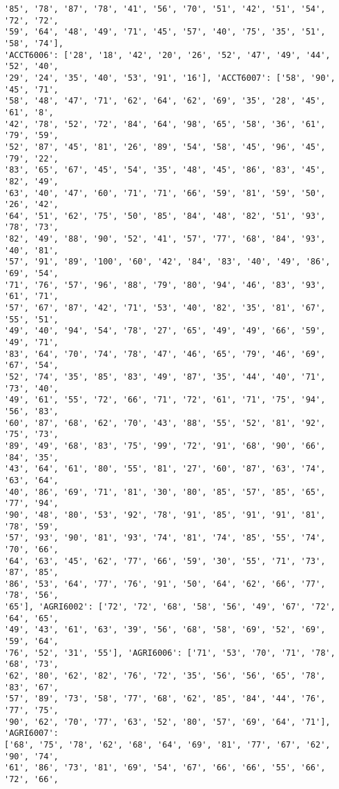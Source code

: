 \documentclass[11pt]{article}
\begin{document}
\begin{Verbatim}[commandchars=\\\{\}]
'85', '78', '87', '78', '41', '56', '70', '51', '42', '51', '54', '72', '72',
'59', '64', '48', '49', '71', '45', '57', '40', '75', '35', '51', '58', '74'],
'ACCT6006': ['28', '18', '42', '20', '26', '52', '47', '49', '44', '52', '40',
'29', '24', '35', '40', '53', '91', '16'], 'ACCT6007': ['58', '90', '45', '71',
'58', '48', '47', '71', '62', '64', '62', '69', '35', '28', '45', '61', '8',
'42', '78', '52', '72', '84', '64', '98', '65', '58', '36', '61', '79', '59',
'52', '87', '45', '81', '26', '89', '54', '58', '45', '96', '45', '79', '22',
'83', '65', '67', '45', '54', '35', '48', '45', '86', '83', '45', '82', '49',
'63', '40', '47', '60', '71', '71', '66', '59', '81', '59', '50', '26', '42',
'64', '51', '62', '75', '50', '85', '84', '48', '82', '51', '93', '78', '73',
'82', '49', '88', '90', '52', '41', '57', '77', '68', '84', '93', '40', '81',
'57', '91', '89', '100', '60', '42', '84', '83', '40', '49', '86', '69', '54',
'71', '76', '57', '96', '88', '79', '80', '94', '46', '83', '93', '61', '71',
'57', '67', '87', '42', '71', '53', '40', '82', '35', '81', '67', '55', '51',
'49', '40', '94', '54', '78', '27', '65', '49', '49', '66', '59', '49', '71',
'83', '64', '70', '74', '78', '47', '46', '65', '79', '46', '69', '67', '54',
'52', '74', '35', '85', '83', '49', '87', '35', '44', '40', '71', '73', '40',
'49', '61', '55', '72', '66', '71', '72', '61', '71', '75', '94', '56', '83',
'60', '87', '68', '62', '70', '43', '88', '55', '52', '81', '92', '75', '73',
'89', '49', '68', '83', '75', '99', '72', '91', '68', '90', '66', '84', '35',
'43', '64', '61', '80', '55', '81', '27', '60', '87', '63', '74', '63', '64',
'40', '86', '69', '71', '81', '30', '80', '85', '57', '85', '65', '77', '94',
'90', '48', '80', '53', '92', '78', '91', '85', '91', '91', '81', '78', '59',
'57', '93', '90', '81', '93', '74', '81', '74', '85', '55', '74', '70', '66',
'64', '63', '45', '62', '77', '66', '59', '30', '55', '71', '73', '87', '85',
'86', '53', '64', '77', '76', '91', '50', '64', '62', '66', '77', '78', '56',
'65'], 'AGRI6002': ['72', '72', '68', '58', '56', '49', '67', '72', '64', '65',
'49', '43', '61', '63', '39', '56', '68', '58', '69', '52', '69', '59', '64',
'76', '52', '31', '55'], 'AGRI6006': ['71', '53', '70', '71', '78', '68', '73',
'62', '80', '62', '82', '76', '72', '35', '56', '56', '65', '78', '83', '67',
'57', '89', '73', '58', '77', '68', '62', '85', '84', '44', '76', '77', '75',
'90', '62', '70', '77', '63', '52', '80', '57', '69', '64', '71'], 'AGRI6007':
['68', '75', '78', '62', '68', '64', '69', '81', '77', '67', '62', '90', '74',
'61', '86', '73', '81', '69', '54', '67', '66', '66', '55', '66', '72', '66',

\end{Verbatim}
\end{document}
